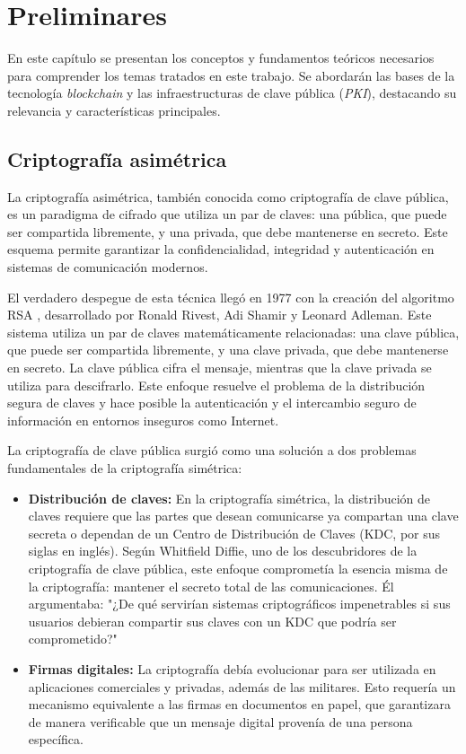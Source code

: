 \chapter{Preliminares}

En este capítulo se presentan los conceptos y fundamentos teóricos necesarios para comprender los temas tratados en este trabajo. 
Se abordarán las bases de la tecnología \textit{blockchain} y las infraestructuras de clave pública (\textit{PKI}), destacando su 
relevancia y características principales.

\section{Criptografía asimétrica}

La criptografía asimétrica, también conocida como criptografía de clave pública, es un paradigma de cifrado que utiliza un par de claves: una pública, que 
puede ser compartida libremente, y una privada, que debe mantenerse en secreto. Este esquema permite garantizar la confidencialidad, integridad y 
autenticación en sistemas de comunicación modernos.

El verdadero despegue de esta técnica llegó en 1977 con la creación del algoritmo RSA \cite{rivest1978method}, desarrollado por Ronald Rivest, Adi Shamir y Leonard Adleman. 
Este sistema utiliza un par de claves matemáticamente relacionadas: una clave pública, que puede ser compartida libremente, y una clave privada, que debe 
mantenerse en secreto. La clave pública cifra el mensaje, mientras que la clave privada se utiliza para descifrarlo. Este enfoque resuelve el problema 
de la distribución segura de claves y hace posible la autenticación y el intercambio seguro de información en entornos inseguros como Internet.

La criptografía de clave pública surgió como una solución a dos problemas fundamentales de la criptografía simétrica:
\begin{itemize}
  \item \textbf{Distribución de claves:} En la criptografía simétrica, la distribución de claves requiere que las partes que desean comunicarse ya compartan una clave secreta o dependan de un Centro de Distribución de Claves (KDC, por sus siglas en inglés). Según Whitfield Diffie, uno de los descubridores de la criptografía de clave pública, este enfoque comprometía la esencia misma de la criptografía: mantener el secreto total de las comunicaciones. Él argumentaba: "¿De qué servirían sistemas criptográficos impenetrables si sus usuarios debieran compartir sus claves con un KDC que podría ser comprometido?" \cite{diffie1976new}
  \item \textbf{Firmas digitales:} La criptografía debía evolucionar para ser utilizada en aplicaciones comerciales y privadas, además de las militares. Esto requería un mecanismo equivalente a las firmas en documentos en papel, que garantizara de manera verificable que un mensaje digital provenía de una persona específica.
\end{itemize}

